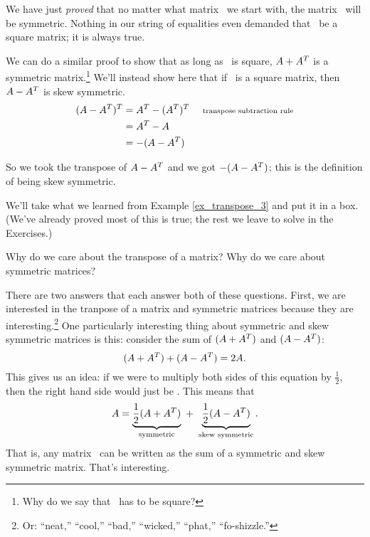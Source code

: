 We have just \textit{proved} that no matter what matrix \tta\ we start with, the matrix \tta\ttat\ will be symmetric. Nothing in our string of equalities even demanded that \tta\ be a square matrix; it is always true. 

We can do a similar proof to show that as long as \tta\ is square, $A+A^T$ is a symmetric matrix.\footnote{Why do we say that \tta\ has to be square?} We'll instead show here that if \tta\ is a square matrix, then $A-A^T$ is skew symmetric.
\begin{align*} (A-A^T)^T &= A^T - (A^T)^T	\quad\ \text{\scriptsize transpose subtraction rule} \\
		&= A^T - A \\
		&= -(A - A^T)
\end{align*}

So we took the transpose of $A - A^T$ and we got $-(A-A^T)$; this is the definition of being skew symmetric.

We'll take what we learned from Example \ref{ex_transpose_3} and put it in a box. (We've already proved most of this is true; the rest we leave to solve in the Exercises.)

	
Why do we care about the transpose of a matrix? Why do we care about symmetric matrices?

There are two answers that each answer both of these questions. First, we are interested in the tranpose of a matrix and symmetric matrices because they are interesting.\footnote{Or: ``neat,'' ``cool,'' ``bad,'' ``wicked,'' ``phat,'' ``fo-shizzle.''} One particularly interesting thing about symmetric and skew symmetric matrices is this: consider the sum of $(A+A^T)$ and $(A-A^T)$:
$$(A+A^T)+(A-A^T) = 2A.$$
This gives us an idea: if we were to multiply both sides of this equation by $\frac12$, then the right hand side would just be \tta. This means that 
$$\tta = \underbrace{\frac12(\tta+\ttat)}_{\text{\centering \scriptsize symmetric}}\ +\ \underbrace{\frac12(\tta-\ttat)}_{\text{\centering\scriptsize skew symmetric}}.$$
That is, any matrix \tta\ can be written as the sum of a symmetric and skew symmetric matrix. That's interesting.
 
